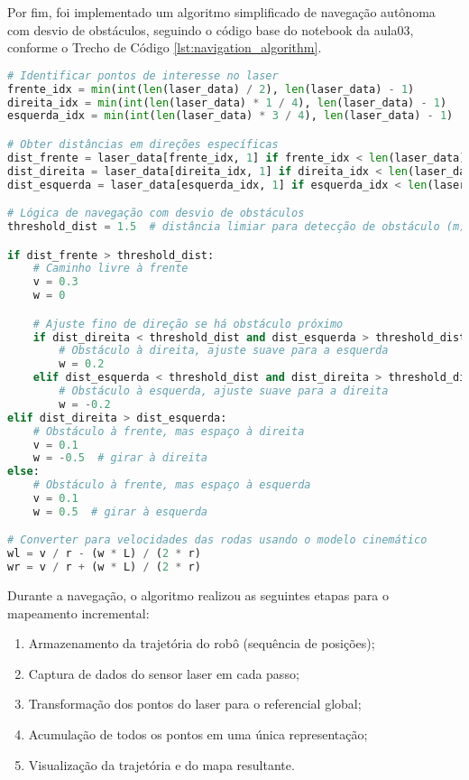 Por fim, foi implementado um algoritmo simplificado de navegação autônoma com desvio de obstáculos, seguindo o código base do notebook da aula03, conforme o Trecho de Código \ref{lst:navigation_algorithm}.

\begin{lstlisting}[language=Python, caption=Algoritmo de navegação autônoma com desvio de obstáculos., label=lst:navigation_algorithm]
# Identificar pontos de interesse no laser
frente_idx = min(int(len(laser_data) / 2), len(laser_data) - 1)
direita_idx = min(int(len(laser_data) * 1 / 4), len(laser_data) - 1)
esquerda_idx = min(int(len(laser_data) * 3 / 4), len(laser_data) - 1)

# Obter distâncias em direções específicas
dist_frente = laser_data[frente_idx, 1] if frente_idx < len(laser_data) else 5.0
dist_direita = laser_data[direita_idx, 1] if direita_idx < len(laser_data) else 5.0
dist_esquerda = laser_data[esquerda_idx, 1] if esquerda_idx < len(laser_data) else 5.0

# Lógica de navegação com desvio de obstáculos
threshold_dist = 1.5  # distância limiar para detecção de obstáculo (m)

if dist_frente > threshold_dist:
    # Caminho livre à frente
    v = 0.3
    w = 0

    # Ajuste fino de direção se há obstáculo próximo
    if dist_direita < threshold_dist and dist_esquerda > threshold_dist:
        # Obstáculo à direita, ajuste suave para a esquerda
        w = 0.2
    elif dist_esquerda < threshold_dist and dist_direita > threshold_dist:
        # Obstáculo à esquerda, ajuste suave para a direita
        w = -0.2
elif dist_direita > dist_esquerda:
    # Obstáculo à frente, mas espaço à direita
    v = 0.1
    w = -0.5  # girar à direita
else:
    # Obstáculo à frente, mas espaço à esquerda
    v = 0.1
    w = 0.5  # girar à esquerda

# Converter para velocidades das rodas usando o modelo cinemático
wl = v / r - (w * L) / (2 * r)
wr = v / r + (w * L) / (2 * r)
\end{lstlisting}

Durante a navegação, o algoritmo realizou as seguintes etapas para o mapeamento incremental:

\begin{enumerate}
    \item Armazenamento da trajetória do robô (sequência de posições);
    \item Captura de dados do sensor laser em cada passo;
    \item Transformação dos pontos do laser para o referencial global;
    \item Acumulação de todos os pontos em uma única representação;
    \item Visualização da trajetória e do mapa resultante.
\end{enumerate}

